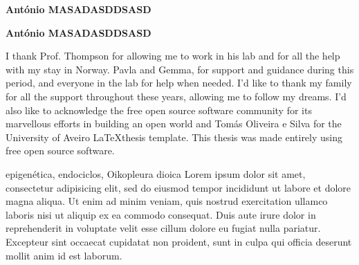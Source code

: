 \documentclass[11pt,twoside,a4paper]{report}
\begin{document}
    \TEXT{}
       {\textbf{António MASADASDDSASD}}
  \vspace*{5mm}
  
    \TEXT{}
       {\textbf{António MASADASDDSASD}}
  \vspace*{5mm}
  
\EndTitlePage

\cleardoublepage


\TitlePage
  \vspace*{55mm}
        {I thank Prof. Thompson for allowing me to work in his lab and for all the help with my stay in Norway. Pavla and Gemma, for support and guidance during this period, and everyone in the lab for help when needed.}
    \TEXT{}
        {I'd like to thank my family for all the support throughout these years, allowing me to follow my dreams.}
    \TEXT{}
		{I'd also like to acknowledge the free open source software community for its marvellous efforts in building an open world and Tomás Oliveira e Silva for the University of Aveiro \LaTeX thesis template.}
    \TEXT{}
        {This thesis was made entirely using free open source software.}


\EndTitlePage

\cleardoublepage


\TitlePage
  \vspace*{55mm}
        {epigenética, endociclos, Oikopleura dioica}
    	{Lorem ipsum dolor sit amet, consectetur adipisicing elit, sed do eiusmod tempor incididunt ut labore et dolore magna aliqua. Ut enim ad minim veniam, quis nostrud exercitation ullamco laboris nisi ut aliquip ex ea commodo consequat. Duis aute irure dolor in reprehenderit in voluptate velit esse cillum dolore eu fugiat nulla pariatur. Excepteur sint occaecat cupidatat non proident, sunt in culpa qui officia deserunt mollit anim id est laborum.}
\EndTitlePage
\end{document}
